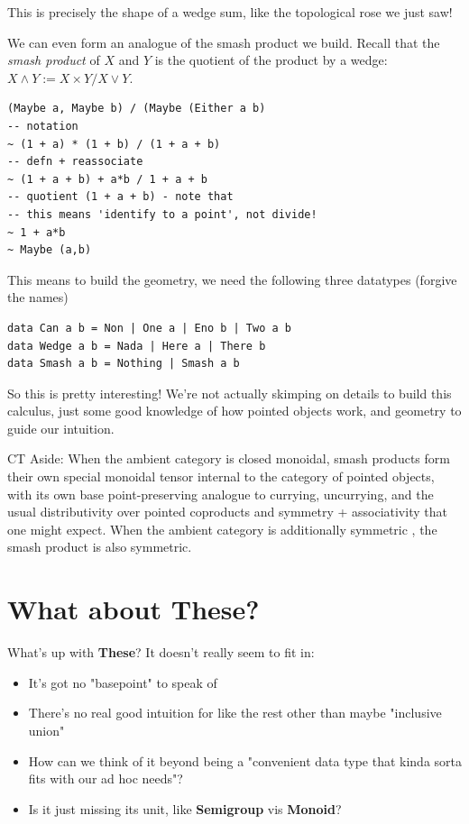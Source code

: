\documentclass[tikz]{beamer}
\theoremstyle{definition}
\begin{document}
\frame
{
	This is precisely the shape of a wedge sum, like the topological rose we just saw!
}

\frame
{
	We can even form an analogue of the smash product we build. Recall that the \textit{smash product} of $X$ and $Y$ is the quotient of the product by a wedge: $X \wedge Y := X \times Y / X \vee Y$.
}

\begin{frame}[fragile]
\begin{verbatim}
(Maybe a, Maybe b) / (Maybe (Either a b)
-- notation
~ (1 + a) * (1 + b) / (1 + a + b)
-- defn + reassociate
~ (1 + a + b) + a*b / 1 + a + b
-- quotient (1 + a + b) - note that
-- this means 'identify to a point', not divide!
~ 1 + a*b
~ Maybe (a,b)
\end{verbatim}
\end{frame}

\frame
{
	This means to build the geometry, we need the following three datatypes (forgive the names)
}
\begin{frame}[fragile]
\begin{verbatim}
data Can a b = Non | One a | Eno b | Two a b
data Wedge a b = Nada | Here a | There b
data Smash a b = Nothing | Smash a b
\end{verbatim}
\end{frame}

\frame
{
	So this is pretty interesting! We're not actually skimping on details to build this calculus, just some good knowledge of how pointed objects work, and geometry to guide our intuition.
}

\frame
{
	CT Aside: When the ambient category is closed monoidal, smash products form their own special monoidal tensor internal to the category of pointed objects, with its own base point-preserving analogue to currying, uncurrying, and the usual distributivity over pointed coproducts and symmetry + associativity that one might expect. When the ambient category is additionally symmetric , the smash product is also symmetric.
	  
}
\section{What about These?}

\frame
{
	What's up with \textbf{These}? It doesn't really seem to fit in: 
	
	\begin{itemize}
		\item It's got no "basepoint" to speak of
		\item There's no real good intuition for like the rest other than maybe "inclusive union"
		\item How can we think of it beyond being a "convenient data type that kinda sorta fits with our ad hoc needs"?
		\item Is it just missing its unit, like \textbf{Semigroup} vis \textbf{Monoid}?
	\end{itemize}
}
\end{document}
